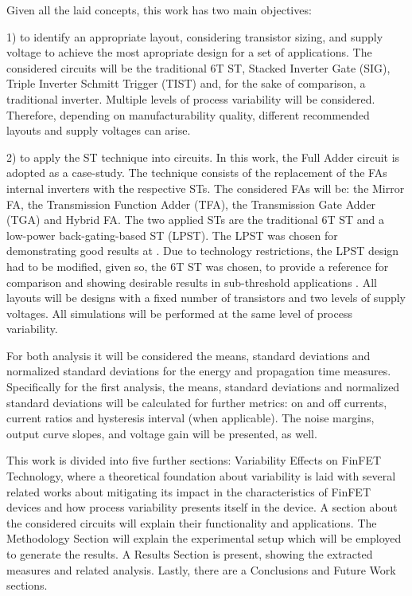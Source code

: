 \documentclass[diss,pgmicro,english]{iiufrgs}
\begin{document}
	Given all the laid concepts, this work has two main objectives:

	1) to identify an appropriate layout, considering transistor sizing, and supply voltage to achieve the most apropriate design for a set of applications. The considered circuits will be the traditional 6T ST, Stacked Inverter Gate (SIG), Triple Inverter Schmitt Trigger (TIST) and, for the sake of comparison, a traditional inverter. Multiple levels of process variability will be considered. Therefore, depending on manufacturability quality, different recommended layouts and supply voltages can arise.

	2) to apply the ST technique into circuits. In this work, the Full Adder circuit is adopted as a case-study. The technique consists of the replacement of the FAs internal inverters with the respective STs. The considered FAs will be: the Mirror FA, the Transmission Function Adder (TFA), the Transmission Gate Adder (TGA) and Hybrid FA. The two applied STs are the traditional 6T ST and a low-power back-gating-based ST (LPST). The LPST was chosen for demonstrating good results at \cite{dokania2015circuit}. Due to technology restrictions, the LPST design had to be modified, given so, the 6T ST was chosen, to provide a reference for comparison and showing desirable results in sub-threshold applications \cite{lotze2017ultra}. All layouts will be designs with a fixed number of transistors and two levels of supply voltages. All simulations will be performed at the same level of process variability.

For both analysis it will be considered the means, standard deviations and normalized standard deviations for the energy and propagation time measures. Specifically for the first analysis, the means, standard deviations and normalized standard deviations will be calculated for further metrics: on and off currents, current ratios and hysteresis interval (when applicable). The noise margins, output curve slopes, and voltage gain will be presented, as well.

    This work is divided into five further sections: Variability Effects on FinFET Technology, where a theoretical foundation about variability is laid with several related works about mitigating its impact in the characteristics of FinFET devices and how process variability presents itself in the device. A section about the considered circuits will explain their functionality and applications. The Methodology Section will explain the experimental setup which will be employed to generate the results. A Results Section is present, showing the extracted measures and related analysis. Lastly, there are a Conclusions and Future Work sections.
\end{document}
